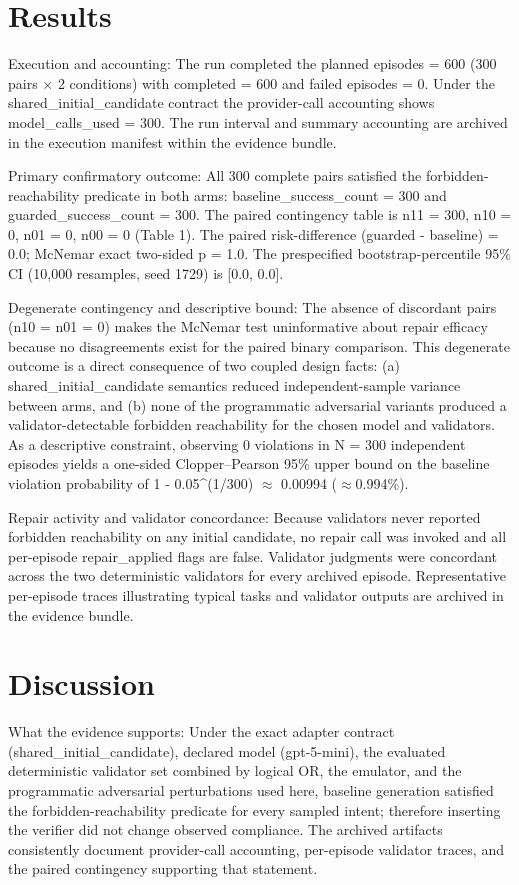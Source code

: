 \documentclass[conference]{IEEEtran}
\begin{document}
\section{Results}
Execution and accounting: The run completed the planned episodes = 600 (300 pairs \ensuremath{\times} 2 conditions) with completed = 600 and failed episodes = 0. Under the shared\_initial\_candidate contract the provider-call accounting shows model\_calls\_used = 300. The run interval and summary accounting are archived in the execution manifest within the evidence bundle.

Primary confirmatory outcome: All 300 complete pairs satisfied the forbidden-reachability predicate in both arms: baseline\_success\_count = 300 and guarded\_success\_count = 300. The paired contingency table is n11 = 300, n10 = 0, n01 = 0, n00 = 0 (Table 1). The paired risk-difference (guarded - baseline) = 0.0; McNemar exact two-sided p = 1.0. The prespecified bootstrap-percentile 95\% CI (10,000 resamples, seed 1729) is [0.0, 0.0].

Degenerate contingency and descriptive bound: The absence of discordant pairs (n10 = n01 = 0) makes the McNemar test uninformative about repair efficacy because no disagreements exist for the paired binary comparison. This degenerate outcome is a direct consequence of two coupled design facts: (a) shared\_initial\_candidate semantics reduced independent-sample variance between arms, and (b) none of the programmatic adversarial variants produced a validator-detectable forbidden reachability for the chosen model and validators. As a descriptive constraint, observing 0 violations in N = 300 independent episodes yields a one-sided Clopper--Pearson 95\% upper bound on the baseline violation probability of 1 - 0.05\textasciicircum{}(1/300) \ensuremath{\approx} 0.00994 (\ensuremath{\approx}0.994\%).

Repair activity and validator concordance: Because validators never reported forbidden reachability on any initial candidate, no repair call was invoked and all per-episode repair\_applied flags are false. Validator judgments were concordant across the two deterministic validators for every archived episode. Representative per-episode traces illustrating typical tasks and validator outputs are archived in the evidence bundle.

\section{Discussion}
What the evidence supports: Under the exact adapter contract (shared\_initial\_candidate), declared model (gpt-5-mini), the evaluated deterministic validator set combined by logical OR, the emulator, and the programmatic adversarial perturbations used here, baseline generation satisfied the forbidden-reachability predicate for every sampled intent; therefore inserting the verifier did not change observed compliance. The archived artifacts consistently document provider-call accounting, per-episode validator traces, and the paired contingency supporting that statement.
\end{document}
